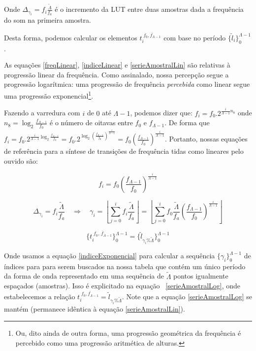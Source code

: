 Onde $\Delta_{\gamma_i}=f_i\frac{\widetilde{\Lambda}}{f_a}$ é o incremento da LUT entre duas amostras dada a frequência do som na primeira amostra.

Desta forma, podemos calcular os elementos $t_i^{\;\overline{f_0,f_{\Lambda-1}}}$
com base no período $\{\widetilde{l}_i\}_0^{\Lambda-1}$.

As equações \ref{freqLinear}, \ref{indiceLinear} e \ref{serieAmostralLin} são relativas à progressão linear
da frequência. Como assinalado, nossa percepção segue a progressão logarítmica:
uma progressão de frequência
\emph{percebida} como linear segue uma progressão exponencial\footnote{Ou,
dito ainda de outra forma, uma progressão geométrica da frequência
é percebido como uma progressão aritmética de alturas.}.

Fazendo a varredura com $i$
de $0$ até $\Lambda-1$, podemos dizer que: $f_i=f_0 . 2^{\frac{i}{\Lambda-1} n_8}$ onde 
$n_8=\log_2\frac{f_{\Lambda-1}}{f_0}$ é o número de oitavas entre $f_0$ e $f_{\Lambda-1}$.
De forma que $f_i=f_0 . 2^{\frac{i}{\Lambda-1}\log_2\frac{f_{\Lambda-1}}{f_0}}=
f_0 . 2^{\log_2\left ( \frac{f_{\Lambda-1}}{f_0} \right )^{\frac{i}{\Lambda-1}}}=
f_0 \left ( \frac{f_{\Lambda-1}}{f_0} \right ) ^{\frac{i}{\Lambda -1}}$. Portanto,
nossas equações de referência para a síntese de transições de frequência tidas como
lineares pelo ouvido são:

\begin{equation}
f_i=f_0 \left ( \frac{f_{\Lambda-1}}{f_0} \right ) ^{\frac{i}{\Lambda -1}}
\end{equation}

\begin{equation}\label{indiceExponencial}
\Delta_{\gamma_i}=f_i\frac{\widetilde{\Lambda}}{f_a} \quad \Rightarrow \quad \gamma_i=\left \lfloor \sum_{j=0}^{i} f_i\frac{\widetilde{\Lambda}}{f_a} \right \rfloor   =\left \lfloor \sum_{j=0}^{i} f_0 \frac{\widetilde{\Lambda}}{f_a} \left ( \frac{f_{\Lambda-1}}{f_0} \right ) ^{\frac{i}{\Lambda -1}} \right \rfloor
\end{equation}

\begin{equation}\label{serieAmostralLog}
\{t_i^{\;\overline{f_0,\,f_{\Lambda-1}}}\}_0^{\Lambda-1}=\{\widetilde{l}_{\gamma_i \% \widetilde{\Lambda}}\}_0^{\Lambda-1}
\end{equation}

Onde usamos a equação \ref{indiceExponencial} para calcular a sequência $\{\gamma_i\}_0^{\Lambda-1}$ de índices para para
serem buscados na nossa tabela que contém um único período da forma de onda representado em uma sequência de $\widetilde{\Lambda}$
pontos igualmente espaçados (amostras).
Isso é explicitado na equação ~\ref{serieAmostralLog}, onde estabelecemos a relação
 $t_i^{\;\overline{f_0,f_{\Lambda-1}}}=\widetilde{l}_{\gamma_i \% \widetilde{\Lambda}}$.
Note que a equação \ref{serieAmostralLog} se mantém (permanece idêntica à equação \ref{serieAmostralLin}).

